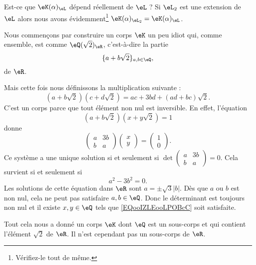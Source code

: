 \begin{example}      \label{EXooJRSUooYhAZkR}
	Est-ce que \( \eK(\alpha)_{\eL}\) dépend réellement de \( \eL\) ? Si \( \eL_2\) est une extension de \( \eL\) alors nous avons évidemment\footnote{Vérifiez-le tout de même.} \( \eK(\alpha)_{\eL_2}=\eK(\alpha)_{\eL}\).

	Nous commençons par construire un corps \( \eK\) un peu idiot qui, comme ensemble, est comme \( \eQ(\sqrt{ 2 })_{\eR}\), c'est-à-dire la partie
	\begin{equation}
		\{ a+b\sqrt{ 2 } \}_{a,b\in \eQ},
	\end{equation}
	de \( \eR\).

	Mais cette fois nous définissons la multiplication suivante :
	\begin{equation}
		(a+b\sqrt{ 2 })(c+d\sqrt{ 2 })=ac+3bd+(ad+bc)\sqrt{ 2 }.
	\end{equation}
	C'est un corps parce que tout élément non nul est inversible. En effet, l'équation
	\begin{equation}        \label{EQooIZLEooLPOBcC}
		(a+b\sqrt{ 2 })(x+y\sqrt{ 2 })=1
	\end{equation}
	donne
	\begin{equation}
		\begin{pmatrix}
			a & 3b \\
			b & a
		\end{pmatrix}\begin{pmatrix}
			x \\
			y
		\end{pmatrix}=\begin{pmatrix}
			1 \\
			0
		\end{pmatrix}.
	\end{equation}
	Ce système a une unique solution si et seulement si \( \det\begin{pmatrix}
		a & 3b \\
		b & a
	\end{pmatrix}=0\). Cela survient si et seulement si
	\begin{equation}
		a^2-3b^2=0.
	\end{equation}
	Les solutions de cette équation dans \( \eR\) sont \( a=\pm\sqrt{ 3 }| b |\). Dès que \( a\) ou \( b\) est non nul, cela ne peut pas satisfaire \( a,b\in \eQ\). Donc le déterminant est toujours non nul et il existe \( x,y\in \eQ\) tels que \eqref{EQooIZLEooLPOBcC} soit satisfaite.

	Tout cela nous a donné un corps \( \eK\) dont \( \eQ\) est un sous-corps et qui contient l'élément \( \sqrt{ 2 }\) de \( \eR\). Il n'est cependant pas un sous-corps de \( \eR\).


\end{example}
